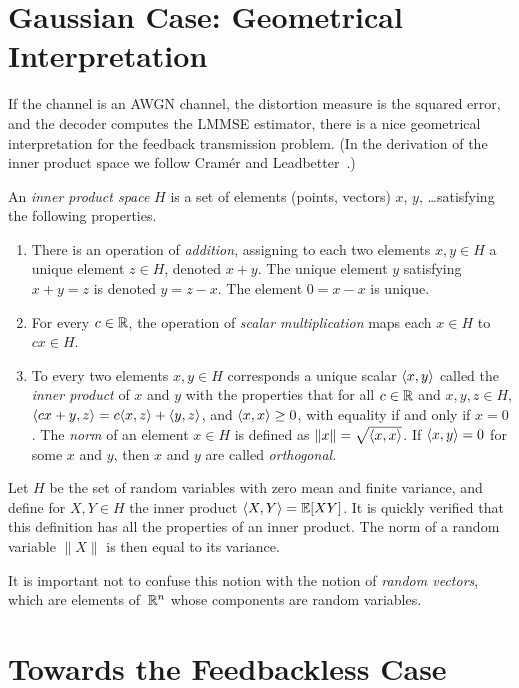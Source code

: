\section{Gaussian Case: Geometrical Interpretation}

If the channel is an AWGN channel, the distortion measure is the squared error,
and the decoder computes the LMMSE estimator, there is a nice geometrical
interpretation for the feedback transmission problem. (In the derivation of the
inner product space we follow Cramér and Leadbetter~\cite{CramerL1967}.)

\begin{definition}
  An \emph{inner product space} $H$ is a set of elements (points, vectors) $x$,
  $y$, \dots satisfying the following properties.
  \begin{enumerate}
    \item There is an operation of \emph{addition}, assigning to each two
      elements $x, y \in H$ a unique element $z \in H$, denoted $x + y$.
      The unique element $y$ satisfying $x + y = z$ is denoted $y = z - x$. The
      element $0 = x-x$ is unique. 
    \item For every $c \in \R$, the operation of \emph{scalar multiplication}
      maps each $x \in H$ to $cx \in H$. 
    \item To every two elements $x,y \in H$ corresponds a unique scalar $\sp x
      y$ called the \emph{inner product} of $x$ and $y$ with the properties that
      for all $c \in \R$ and $x,y, z\in H$, $\sp{cx+y}{z} = c\sp xz + \sp yz$,
      and $\sp xx \ge 0$, with equality if and only if $x = 0$. The
      \emph{norm} of an element $x \in H$ is defined as $\|x\| = \sqrt{\sp xx}$.
      If $\sp xy = 0$ for some $x$ and $y$, then $x$ and $y$ are called
      \emph{orthogonal}.
  \end{enumerate}
\end{definition}

Let $H$ be the set of random variables with zero mean and finite variance, and
define for $X, Y \in H$ the inner product $\sp XY = \E[X Y]$. It is quickly
verified that this definition has all the properties of an inner product.
The norm of a random variable $\|X\|$ is then equal to its variance. 

It is important not to confuse this notion with the notion of \emph{random
vectors}, which are elements of~$\R^n$ whose components are random variables.




\section{Towards the Feedbackless Case}

